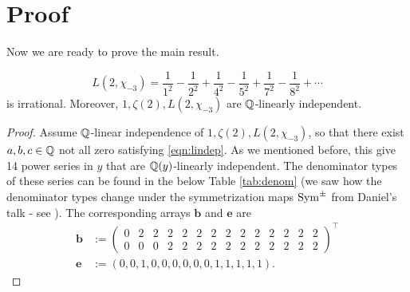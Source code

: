 \section{Proof}

Now we are ready to prove the main result.

\begin{theorem}
\label{thm:irrational}
$$
    L(2, \chi_{-3}) = \frac{1}{1^2} - \frac{1}{2^2} + \frac{1}{4^2} - \frac{1}{5^2} + \frac{1}{7^2} - \frac{1}{8^2} + \cdots
$$
is irrational. 
Moreover, $1, \zeta(2), L(2, \chi_{-3})$ are $\mathbb{Q}$-linearly independent.
\end{theorem}

\begin{proof}
Assume $\mathbb{Q}$-linear independence of $1, \zeta(2), L(2, \chi_{-3})$, so that there exist $a, b, c \in \mathbb{Q}$ not all zero satisfying \eqref{eqn:lindep}.
As we mentioned before, this give 14 power series in $y$ that are $\mathbb{Q}(y)$-linearly independent.
The denominator types of these series can be found in the below Table \ref{tab:denom} (we saw how the denominator types change under the symmetrization maps $\mathrm{Sym}^{\pm}$ from Daniel's talk - see \cite[Lemma 9.0.3]{calegari2024linear}).
The corresponding arrays $\mathbf{b}$ and $\mathbf{e}$ are
\begin{align*}
    \mathbf{b} &:= \begin{pmatrix}
        0 & 2 & 2 & 2 & 2 & 2 & 2 & 2 & 2 & 2 & 2 & 2 & 2 & 2 \\
        0 & 0 & 0 & 2 & 2 & 2 & 2 & 2 & 2 & 2 & 2 & 2 & 2 & 2
    \end{pmatrix}^\intercal \\
    \mathbf{e} &:= (0, 0, 1, 0, 0, 0, 0, 0, 0, 1, 1, 1, 1, 1).
\end{align*}


\end{proof}
